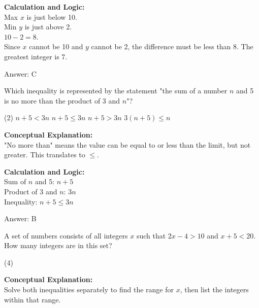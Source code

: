 \documentclass[11pt,paper=a4,answers]{exam}
\begin{document}
\begin{questions}
\begin{solution}
\vspace{10pt}
\textbf{Calculation and Logic:} \\
Max $x$ is just below 10. \\
Min $y$ is just above 2. \\
$10 - 2 = 8$. \\
Since $x$ cannot be 10 and $y$ cannot be 2, the difference must be less than 8. The greatest integer is 7.

\vspace{15pt}
Answer: \colorbox{yellow!100}{C}
\end{solution}

\vspace{20pt}

\question
Which inequality is represented by the statement "the sum of a number $n$ and 5 is no more than the product of 3 and $n$"?
\begin{tasks}(2)
    \task $n + 5 < 3n$
    \task $n + 5 \le 3n$
    \task $n + 5 > 3n$
    \task $3(n + 5) \le n$
\end{tasks}

\begin{solution}
\textbf{Conceptual Explanation:} \\
"No more than" means the value can be equal to or less than the limit, but not greater. This translates to $\le$.

\vspace{10pt}
\textbf{Calculation and Logic:} \\
Sum of $n$ and 5: $n + 5$ \\
Product of 3 and $n$: $3n$ \\
Inequality: $n + 5 \le 3n$

\vspace{15pt}
Answer: \colorbox{yellow!100}{B}
\end{solution}

\vspace{20pt}

\question
A set of numbers consists of all integers $x$ such that $2x - 4 > 10$ and $x + 5 < 20$. How many integers are in this set?
\begin{tasks}(4)
\end{tasks}

\begin{solution}
\textbf{Conceptual Explanation:} \\
Solve both inequalities separately to find the range for $x$, then list the integers within that range.


\end{solution}
\end{questions}
\end{document}
